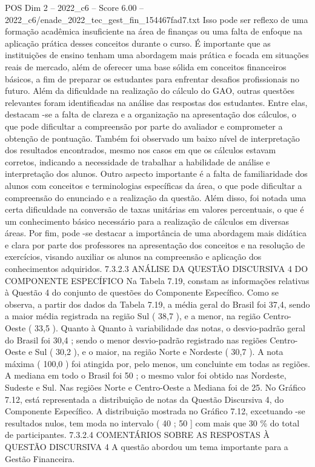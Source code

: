 \begin{textsample}{POS Dim 2 – 2022\_c6 – Score 6.00 – 2022\_c6/enade\_2022\_tec\_gest\_fin\_154467fad7.txt}
Isso pode ser reflexo de uma formação acadêmica insuficiente na área de finanças ou uma falta de enfoque na aplicação prática desses conceitos durante o curso.
É importante que as instituições de ensino tenham uma abordagem mais prática e focada em situações reais de mercado, além de oferecer uma base sólida em conceitos financeiros básicos, a fim de preparar os estudantes para enfrentar desafios profissionais no futuro.
Além da dificuldade na realização do cálculo do GAO, outras questões relevantes foram identificadas na análise das respostas dos estudantes.
Entre elas, destacam -se a falta de clareza e a organização na apresentação dos cálculos, o que pode dificultar a compreensão por parte do avaliador e comprometer a obtenção de pontuação.
Também foi observado um baixo nível de interpretação dos resultados encontrados, mesmo nos casos em que os cálculos estavam corretos, indicando a necessidade de trabalhar a habilidade de análise e interpretação dos alunos.
Outro aspecto importante é a falta de familiaridade dos alunos com conceitos e terminologias específicas da área, o que pode dificultar a compreensão do enunciado e a realização da questão.
Além disso, foi notada uma certa dificuldade na conversão de taxas unitárias em valores percentuais, o que é um conhecimento básico necessário para a realização de cálculos em diversas áreas.
Por fim, pode -se destacar a importância de uma abordagem mais didática e clara por parte dos professores na apresentação dos conceitos e na resolução de exercícios, visando auxiliar os alunos na compreensão e aplicação dos conhecimentos adquiridos. 7.3.2.3 ANÁLISE DA QUESTÃO DISCURSIVA 4 DO COMPONENTE ESPECÍFICO Na Tabela 7.19, constam as informações relativas à Questão 4 do conjunto de questões do Componente Específico.
Como se observa, a partir dos dados da Tabela 7.19, a média geral do Brasil foi 37,4, sendo a maior média registrada na região Sul ( 38,7 ), e a menor, na região Centro-Oeste ( 33,5 ).
Quanto à Quanto à variabilidade das notas, o desvio-padrão geral do Brasil foi 30,4 ; sendo o menor desvio-padrão registrado nas regiões Centro-Oeste e Sul ( 30,2 ), e o maior, na região Norte e Nordeste ( 30,7 ).
A nota máxima ( 100,0 ) foi atingida por, pelo menos, um concluinte em todas as regiões.
A mediana em todo o Brasil foi 50 ; o mesmo valor foi obtido nas Nordeste, Sudeste e Sul.
Nas regiões Norte e Centro-Oeste a Mediana foi de 25.
No Gráfico 7.12, está representada a distribuição de notas da Questão Discursiva 4, do Componente Específico.
A distribuição mostrada no Gráfico 7.12, excetuando -se resultados nulos, tem moda no intervalo ( 40 ; 50 ] com mais que 30 \% do total de participantes. 7.3.2.4 COMENTÁRIOS SOBRE AS RESPOSTAS À QUESTÃO DISCURSIVA 4 A questão abordou um tema importante para a Gestão Financeira.

\end{textsample}
